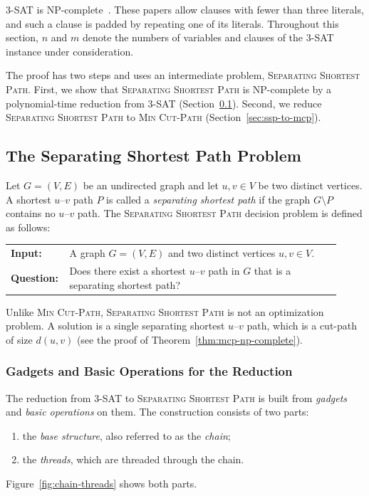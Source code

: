 \documentclass[a4paper,fleqn]{cas-sc}
\numberwithin{equation}{section}
\theoremstyle{definition}
\theoremstyle{plain}
\theoremstyle{remark}
\newcommand{\MinCutPath}{\textsc{Min Cut-Path}}
\newcommand{\SSP}{\textsc{Separating Shortest Path}}
\newcommand{\ThreeSAT}{\textsc{3-SAT}}
\begin{document}
\ThreeSAT{} is NP-complete~\cite{Cook1971Complexity,Karp1972Reducibility}.
These papers allow clauses with fewer than three literals, and such a clause is padded by repeating one of its literals.
Throughout this section, $n$ and $m$ denote the numbers of variables and clauses of the \ThreeSAT{} instance under consideration.

The proof has two steps and uses an intermediate problem, \SSP.
First, we show that \SSP{} is NP-complete by a polynomial-time reduction from \ThreeSAT{} (Section~\ref{sec:ssp}).
Second, we reduce \SSP{} to \MinCutPath{} (Section~\ref{sec:ssp-to-mcp}).

\subsection{The Separating Shortest Path Problem}\label{sec:ssp}

\begin{problem}[\SSP]
Let $G = (V,E)$ be an undirected graph and let $u,v \in V$ be two distinct vertices.
A shortest $u$--$v$ path $P$ is called a \emph{separating shortest path} if the graph $G \setminus P$ contains no $u$--$v$ path.
The \SSP{} decision problem is defined as follows:

\begin{center}
\begin{tabular}{p{0.12\linewidth}p{0.8\linewidth}}
\textbf{Input:} & A graph $G = (V,E)$ and two distinct vertices $u,v \in V$.\\
\textbf{Question:} & Does there exist a shortest $u$--$v$ path in $G$ that is a separating shortest path?
\end{tabular}
\end{center}
\end{problem}

Unlike \MinCutPath, \SSP{} is not an optimization problem.
A solution is a single separating shortest $u$--$v$ path, which is a cut-path of size $d(u,v)$ (see the proof of Theorem~\ref{thm:mcp-np-complete}).

\subsubsection{Gadgets and Basic Operations for the Reduction}

The reduction from \ThreeSAT{} to \SSP{} is built from \emph{gadgets} and \emph{basic operations} on them.
The construction consists of two parts:
\begin{enumerate}
    \item the \emph{base structure}, also referred to as the \emph{chain};
    \item the \emph{threads}, which are threaded through the chain.
\end{enumerate}
Figure~\ref{fig:chain-threads} shows both parts.
\end{document}
